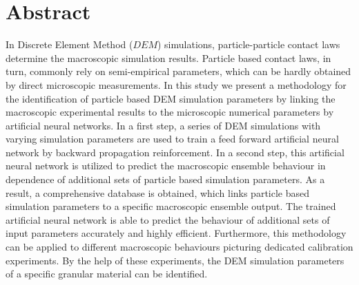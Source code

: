 \section{Abstract}
\label{sec:abstract}

In Discrete Element Method ($DEM$) simulations, particle-particle contact laws
determine the macroscopic simulation results. Particle based contact laws, in
turn, commonly rely on semi-empirical parameters, which can be hardly obtained
by direct microscopic measurements.
In this study we present a methodology for the identification of particle based
DEM simulation parameters by linking the macroscopic experimental results to the
microscopic numerical parameters by artificial neural networks.
In a first step, a series
of DEM simulations with varying simulation parameters are used to train a feed
forward artificial neural network by backward propagation reinforcement. In a
second step, this artificial neural network is utilized to predict the
macroscopic ensemble behaviour in dependence of additional sets of particle
based simulation parameters.
As a result, a comprehensive database is obtained,
which links particle based simulation parameters to a specific macroscopic ensemble output.
The trained artificial neural network is able to predict the behaviour of
additional sets of input parameters accurately and highly efficient.
Furthermore, this methodology can be applied to different macroscopic behaviours
picturing dedicated calibration experiments.
By the help of these experiments, the DEM simulation parameters of a specific granular material can be identified.

